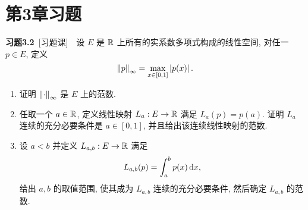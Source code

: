 \section{第3章习题}

    \textbf{习题3.2}\ [习题课]\ \ 设 $ E $ 是 $ \mathbb{R} $ 上所有的实系数多项式构成的线性空间, 对任一 $ p\in E $, 定义
    \[
        \left\| p \right\|_{\infty}=\max_{x\in[0, 1]}\left| p(x) \right| .
    \]
    \begin{enumerate}[(1)]
        \item 证明 $ \left\| \cdot \right\|_{\infty} $ 是 $ E $ 上的范数.
        \item 任取一个 $ a\in\mathbb{R} $, 定义线性映射 $ L_{a}:E\to \mathbb{R} $ 满足 $ L_{a}(p)=p(a) $. 证明 $ L_{a} $ 连续的充分必要条件是 $ a\in[0, 1] $, 并且给出该连续线性映射的范数.
        \item 设 $ a<b $ 并定义 $ L_{a, b}:E\to \mathbb{R} $ 满足
        \[
            L_{a, b}(p)=\int_{a}^{b}p(x)\,\mathrm{d} x,
        \]
        给出 $ a, b $ 的取值范围, 使其成为 $ L_{a, b} $ 连续的充分必要条件, 然后确定 $ L_{a, b} $ 的范数.
    \end{enumerate}

